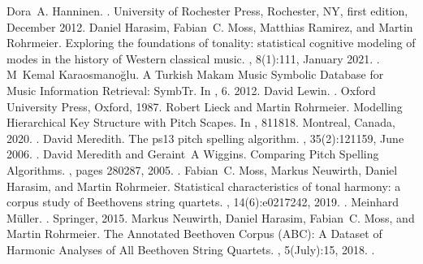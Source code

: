 \documentclass[letterpaper,10pt,english]{sphinxmanual}
\begin{document}
\begin{sphinxthebibliography}{10}
Dora A. Hanninen. . University of Rochester Press, Rochester, NY, first edition, December 2012.
Daniel Harasim, Fabian C. Moss, Matthias Ramirez, and Martin Rohrmeier. Exploring the foundations of tonality: statistical cognitive modeling of modes in the history of Western classical music. , 8(1):1\textendash{}11, January 2021. .
M Kemal Karaosmanoğlu. A Turkish Makam Music Symbolic Database for Music Information Retrieval: SymbTr. In , 6. 2012.
David Lewin. . Oxford University Press, Oxford, 1987.
Robert Lieck and Martin Rohrmeier. Modelling Hierarchical Key Structure with Pitch Scapes. In , 811\textendash{}818. Montreal, Canada, 2020. .
David Meredith. The ps13 pitch spelling algorithm. , 35(2):121\textendash{}159, June 2006. .
David Meredith and Geraint A Wiggins. Comparing Pitch Spelling Algorithms. , pages 280\textendash{}287, 2005. .
Fabian C. Moss, Markus Neuwirth, Daniel Harasim, and Martin Rohrmeier. Statistical characteristics of tonal harmony: a corpus study of Beethoven\textquotesingle{}s string quartets. , 14(6):e0217242, 2019. .
Meinhard Müller. . Springer, 2015.
Markus Neuwirth, Daniel Harasim, Fabian C. Moss, and Martin Rohrmeier. The Annotated Beethoven Corpus (ABC): A Dataset of Harmonic Analyses of All Beethoven String Quartets. , 5(July):1\textendash{}5, 2018. .

\end{sphinxthebibliography}
\end{document}
